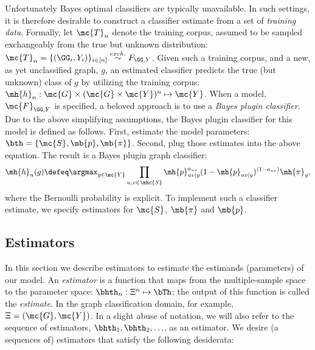 \documentclass[10pt,journal,cspaper,compsoc]{IEEEtran}
\begin{document}
Unfortunately Bayes optimal classifiers are typically unavailable. In such settings, it is therefore desirable to construct a classifier estimate from a set of \emph{training data}. Formally, let $\mc{T}_n$ denote the training corpus, assumed to be sampled exchangeably from the true but unknown distribution: $\mc{T}_n=\{(\GG_i,Y_i)\}_{i \in [n]} \overset{exch.}{\sim} F_{\GG, Y}$.  Given such a training corpus, and a new, as yet unclassified graph, $g$, an estimated classifier predicts the true (but unknown) class of $g$ by utilizing the training corpus: $\mh{h}_n: \mc{G} \times (\mc{G} \times \mc{Y})^n \mapsto \mc{Y}$.  When a model, $\mc{F}_{\GG,Y}$ is specified, a beloved approach is to use  a  \emph{Bayes plugin classifier}. Due to the above simplifying assumptions, the Bayes plugin classifier for this model is defined as follows.  First, estimate the  model parameters: $\bth=\{\mc{S}, \mb{p}, \mb{\pi}\}$. Second, plug those estimates into the above equation.  The result is a Bayes plugin graph classifier:
\begin{align}
\mh{h}_n(g) \defeq  \argmax_{y \in \mc{Y}} \prod_{u,v \in \mhc{S}}
\mh{p}_{uv|y}^{a_{uv}}(1-\mh{p}_{uv|y})^{(1-a_{uv})} \mh{\pi}_y,
\end{align}
where the Bernoulli probability is explicit. To implement such a classifier estimate, we specify estimators for $\mc{S}$, $\mb{\pi}$ and $\mb{p}$.


\subsection{Estimators} %
\label{sub:estimators}


In this section we describe estimators to estimate the estimands (parameters) of our model.  An \emph{estimator} is a function that maps from the multiple-sample space to the parameter space: $\bhth_n: \Xi^n \mapsto \bTh$; the output of this function is called the \emph{estimate}.  In the graph classification domain, for example, $\Xi=(\mc{G},\mc{Y})$.  In a slight abuse of notation, we will also refer to the sequence of estimators, $\bhth_1,\bhth_2, \ldots$, as an estimator.  We desire (a sequences of) estimators that satisfy the following desiderata:
\end{document}
